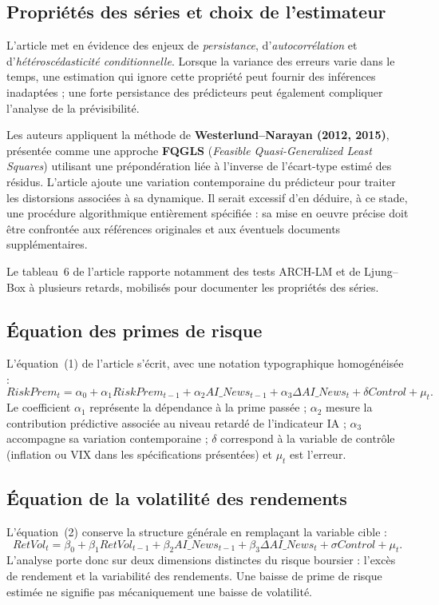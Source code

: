 \documentclass[11pt,a4paper]{article}
\begin{document}
\subsection{Propriétés des séries et choix de l'estimateur}
L'article met en évidence des enjeux de \emph{persistance}, d'\emph{autocorrélation} et d'\emph{hétéroscédasticité conditionnelle}. Lorsque la variance des erreurs varie dans le temps, une estimation qui ignore cette propriété peut fournir des inférences inadaptées ; une forte persistance des prédicteurs peut également compliquer l'analyse de la prévisibilité.

Les auteurs appliquent la méthode de \textbf{Westerlund--Narayan (2012, 2015)}, présentée comme une approche \textbf{FQGLS} (\textit{Feasible Quasi-Generalized Least Squares}) utilisant une prépondération liée à l'inverse de l'écart-type estimé des résidus. L'article ajoute une variation contemporaine du prédicteur pour traiter les distorsions associées à sa dynamique. Il serait excessif d'en déduire, à ce stade, une procédure algorithmique entièrement spécifiée : sa mise en oeuvre précise doit être confrontée aux références originales et aux éventuels documents supplémentaires.

Le tableau~6 de l'article rapporte notamment des tests ARCH-LM et de Ljung--Box à plusieurs retards, mobilisés pour documenter les propriétés des séries.

\subsection{Équation des primes de risque}
L'équation~(1) de l'article s'écrit, avec une notation typographique homogénéisée :
\begin{equation}
\label{eq:risk}
RiskPrem_t = \alpha_0 + \alpha_1 RiskPrem_{t-1}
 + \alpha_2 AI\_News_{t-1} + \alpha_3\Delta AI\_News_t
 + \delta Control + \mu_t.
\end{equation}
Le coefficient $\alpha_1$ représente la dépendance à la prime passée ; $\alpha_2$ mesure la contribution prédictive associée au niveau retardé de l'indicateur IA ; $\alpha_3$ accompagne sa variation contemporaine ; $\delta$ correspond à la variable de contrôle (inflation ou VIX dans les spécifications présentées) et $\mu_t$ est l'erreur.

\subsection{Équation de la volatilité des rendements}
L'équation~(2) conserve la structure générale en remplaçant la variable cible :
\begin{equation}
\label{eq:vol}
RetVol_t = \beta_0 + \beta_1 RetVol_{t-1}
 + \beta_2 AI\_News_{t-1} + \beta_3\Delta AI\_News_t
 + \sigma Control + \mu_t.
\end{equation}
L'analyse porte donc sur deux dimensions distinctes du risque boursier : l'excès de rendement et la variabilité des rendements. Une baisse de prime de risque estimée ne signifie pas mécaniquement une baisse de volatilité.
\end{document}
